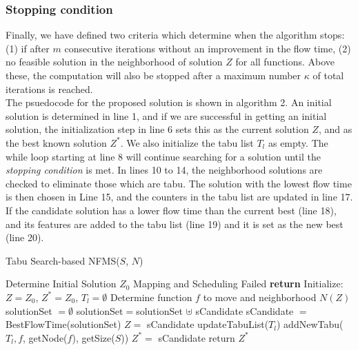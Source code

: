 \documentclass[conference]{IEEEtran}
\begin{document}
\subsubsection{Stopping condition} Finally, we have defined two criteria which determine when the algorithm stops: (1) if after $m$ consecutive iterations without an improvement in the flow time, (2) no feasible solution in the neighborhood of solution $Z$ for all functions. Above these, the computation will also be stopped after a maximum number $\kappa$ of total iterations is reached.\\
\indent The psuedocode for the proposed solution is shown in algorithm 2. An initial solution is determined in line 1,  and if we are successful in getting an initial solution, the initialization step in line 6 sets this as the current solution $Z$, and as the best known solution $Z^*$. We also initialize the tabu list $T_l$ as empty. The while loop starting at line 8 will continue searching for a solution until the \textit{stopping condition} is met. In lines 10 to 14, the neighborhood solutions are checked to eliminate those which are tabu. The solution with the lowest flow time is then chosen in Line 15, and the counters in the tabu list are updated in line 17. If the candidate solution has a lower flow time than the current best (line 18), and its features are added to the tabu list (line 19) and it is set as the new best (line 20).
\begin{algorithm}[t]
\caption{Tabu Search-based NFMS($S$, $N$)}
\label{tscode}
\begin{algorithmic}[1]
\STATE Determine Initial Solution $Z_0$
\STATE Mapping and Scheduling Failed
\STATE \textbf{return}
\ENDIF
\STATE Initialize: $Z = Z_0$, $Z^* = Z_0$, $T_l = \emptyset$
\STATE Determine function $f$ to move and neighborhood $N(Z)$
\STATE solutionSet $= \emptyset$ 
\STATE solutionSet$=$solutionSet $\uplus$ sCandidate
\ENDIF
\ENDFOR
\STATE sCandidate $=$ BestFlowTime(solutionSet)
\STATE $Z =$ sCandidate
\STATE updateTabuList($T_l$)
\STATE addNewTabu($T_l, f$, getNode($f$), getSize($S$))
\STATE $Z^* =$ sCandidate
\ENDIF
\ENDWHILE
\STATE return $Z^*$
\end{algorithmic}
\end{algorithm}
\end{document}
